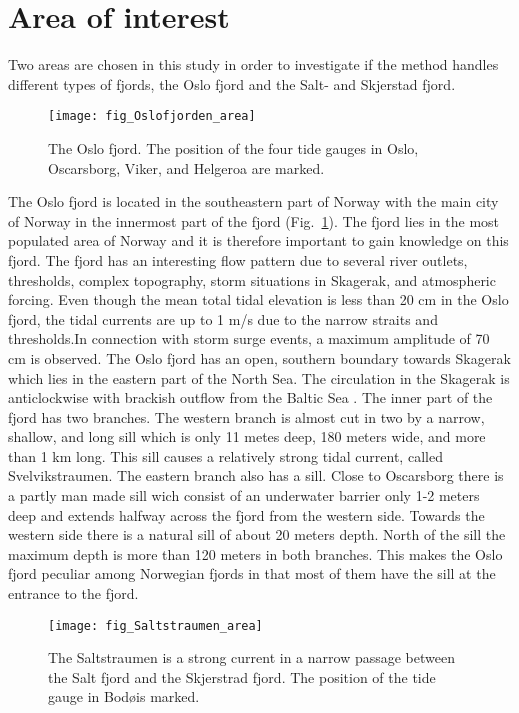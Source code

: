
\section{Area of interest}
Two areas are chosen in this study in order to investigate if the method handles different types of fjords, the Oslo fjord and the Salt- and Skjerstad fjord.

\begin{figure}[!t]
\centering
\texttt{[image: fig\_Oslofjorden\_area]}
\caption{The Oslo fjord. The position of the four tide gauges in Oslo, Oscarsborg, Viker, and Helgeroa are marked.}
\label{fig:area1}
\end{figure}

The Oslo fjord is located in the southeastern part of Norway with the main city of Norway in the innermost part of the fjord (Fig.~\ref{fig:area1}). The fjord lies in the most populated area of Norway and it is therefore important to gain knowledge on this fjord. The fjord has an interesting flow pattern due to several river outlets, thresholds, complex topography, storm situations in Skagerak, and atmospheric forcing. 
Even though the mean total tidal elevation is less than 20 cm in the Oslo fjord, the tidal currents are up to 1 m/s due to the narrow straits and thresholds.In connection with storm surge events, a maximum amplitude of 70 cm is observed. The Oslo fjord has an open, southern boundary towards Skagerak which lies in the eastern part of the North Sea. The circulation in the Skagerak is anticlockwise with brackish outflow from the Baltic Sea \cite[]{rodhe96,svendsen96}. 
The inner part of the fjord has two branches. The western branch is almost cut in two by a narrow, shallow, and long sill which is only 11 metes deep, 180 meters wide, and more than 1 km long. This sill causes a relatively strong tidal current, called Svelvikstraumen. The eastern branch also has a sill. Close to Oscarsborg there is a partly man made sill wich consist of an underwater barrier only 1-2 meters deep and extends halfway across the fjord from the western side. Towards the western side there is a natural sill of about 20 meters depth. North of the sill the maximum depth is more than 120 meters in both branches.  This makes the Oslo fjord peculiar among Norwegian fjords in that most of them have the sill at the entrance to the fjord.

\begin{figure}[!t]
\centering
\texttt{[image: fig\_Saltstraumen\_area]}
\caption{The Saltstraumen is a strong current in a narrow passage between the Salt fjord and the Skjerstrad fjord. The position of the tide gauge in Bod\o is marked.}
\label{fig:area2}
\end{figure}

